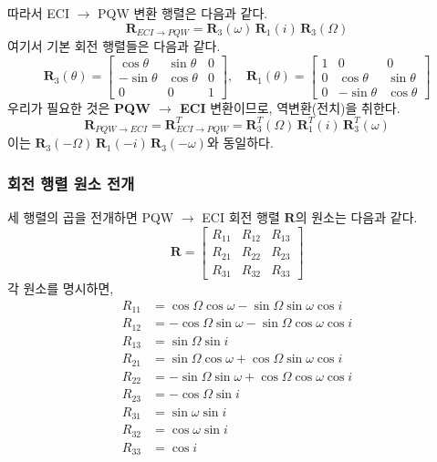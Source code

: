 \documentclass[11pt]{article}
\begin{document}
따라서 ECI $\to$ PQW 변환 행렬은 다음과 같다.
\[
  \mathbf{R}_{ECI \to PQW} = \mathbf{R}_3(\omega) \, \mathbf{R}_1(i) \, \mathbf{R}_3(\Omega)
\]
여기서 기본 회전 행렬들은 다음과 같다.
\[
  \mathbf{R}_3(\theta) = \begin{bmatrix} \cos\theta & \sin\theta & 0 \\ -\sin\theta & \cos\theta & 0 \\ 0 & 0 & 1 \end{bmatrix}, \quad \mathbf{R}_1(\theta) = \begin{bmatrix} 1 & 0 & 0 \\ 0 & \cos\theta & \sin\theta \\ 0 & -\sin\theta & \cos\theta \end{bmatrix}
\]
우리가 필요한 것은 \textbf{PQW $\to$ ECI} 변환이므로, 역변환(전치)을 취한다.
\[
  \mathbf{R}_{PQW \to ECI} = \mathbf{R}_{ECI \to PQW}^T = \mathbf{R}_3^T(\Omega) \, \mathbf{R}_1^T(i) \, \mathbf{R}_3^T(\omega)
\]
이는 $\mathbf{R}_3(-\Omega) \, \mathbf{R}_1(-i) \, \mathbf{R}_3(-\omega)$와 동일하다.

\subsubsection{회전 행렬 원소 전개}

세 행렬의 곱을 전개하면 PQW $\to$ ECI 회전 행렬 $\mathbf{R}$의 원소는 다음과 같다.
\[
  \mathbf{R} = \begin{bmatrix} R_{11} & R_{12} & R_{13} \\ R_{21} & R_{22} & R_{23} \\ R_{31} & R_{32} & R_{33} \end{bmatrix}
\]
각 원소를 명시하면,
\begin{align*}
  R_{11} &= \cos\Omega\cos\omega - \sin\Omega\sin\omega\cos i \\
  R_{12} &= -\cos\Omega\sin\omega - \sin\Omega\cos\omega\cos i \\
  R_{13} &= \sin\Omega\sin i \\
  R_{21} &= \sin\Omega\cos\omega + \cos\Omega\sin\omega\cos i \\
  R_{22} &= -\sin\Omega\sin\omega + \cos\Omega\cos\omega\cos i \\
  R_{23} &= -\cos\Omega\sin i \\
  R_{31} &= \sin\omega\sin i \\
  R_{32} &= \cos\omega\sin i \\
  R_{33} &= \cos i
\end{align*}
\end{document}
